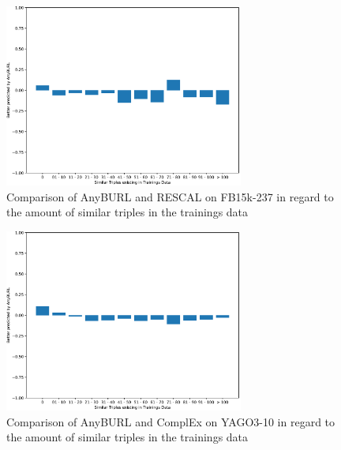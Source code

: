 \begin{figure}[H]
\centering
\includegraphics[width=0.7\textwidth]{images/similar_triples_steps_anyburl_rescal_codex.PNG}
\caption{Comparison of AnyBURL and RESCAL on FB15k-237 in regard to the amount of similar triples in the trainings data}
\label{fig:similar_triples_steps_anyburl_rescal_fb15k}
\end{figure}

\begin{figure}[H]
\centering
\includegraphics[width=0.7\textwidth]{images/similar_triples_steps_anyburl_complex_yago.PNG}
\caption{Comparison of AnyBURL and ComplEx on YAGO3-10 in regard to the amount of similar triples in the trainings data}
\label{fig:similar_triples_steps_anyburl_complex_yago}
\end{figure}

